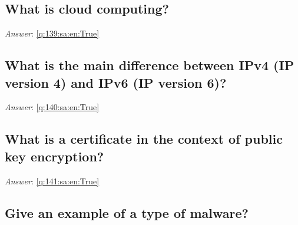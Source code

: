 \documentclass[a4paper,11pt,oneside]{article}
\begin{document}
\begin{sloppypar}
\subsection{What is cloud computing?}

\label{q:139:sa:en:False}

\vspace{2cm}

\noindent\makebox[\textwidth]{\hrulefill}

\vspace{1cm}

\textit{Answer}: \autoref{q:139:sa:en:True}



\subsection{What is the main difference between IPv4 (IP version 4) and IPv6 (IP version 6)?}

\label{q:140:sa:en:False}

\vspace{2cm}

\noindent\makebox[\textwidth]{\hrulefill}

\vspace{1cm}

\textit{Answer}: \autoref{q:140:sa:en:True}



\subsection{What is a certificate in the context of public key encryption?}

\label{q:141:sa:en:False}

\vspace{2cm}

\noindent\makebox[\textwidth]{\hrulefill}

\vspace{1cm}

\textit{Answer}: \autoref{q:141:sa:en:True}



\subsection{Give an example of a type of malware?}

\label{q:142:sa:en:False}

\vspace{2cm}


\end{sloppypar}
\end{document}
